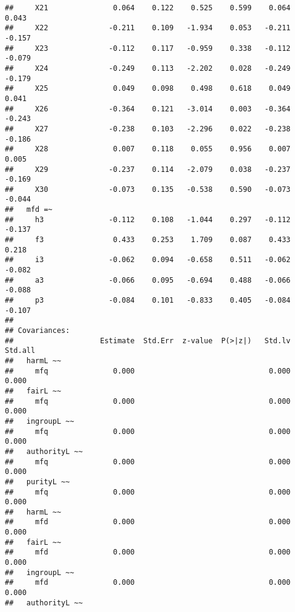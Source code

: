 \documentclass[english,man]{apa6}
\newcounter{author}
\theoremstyle{definition}
\theoremstyle{definition}
\theoremstyle{definition}
\theoremstyle{remark}
\begin{document}
\begin{verbatim}
##     X21               0.064    0.122    0.525    0.599    0.064    0.043
##     X22              -0.211    0.109   -1.934    0.053   -0.211   -0.157
##     X23              -0.112    0.117   -0.959    0.338   -0.112   -0.079
##     X24              -0.249    0.113   -2.202    0.028   -0.249   -0.179
##     X25               0.049    0.098    0.498    0.618    0.049    0.041
##     X26              -0.364    0.121   -3.014    0.003   -0.364   -0.243
##     X27              -0.238    0.103   -2.296    0.022   -0.238   -0.186
##     X28               0.007    0.118    0.055    0.956    0.007    0.005
##     X29              -0.237    0.114   -2.079    0.038   -0.237   -0.169
##     X30              -0.073    0.135   -0.538    0.590   -0.073   -0.044
##   mfd =~                                                                
##     h3               -0.112    0.108   -1.044    0.297   -0.112   -0.137
##     f3                0.433    0.253    1.709    0.087    0.433    0.218
##     i3               -0.062    0.094   -0.658    0.511   -0.062   -0.082
##     a3               -0.066    0.095   -0.694    0.488   -0.066   -0.088
##     p3               -0.084    0.101   -0.833    0.405   -0.084   -0.107
## 
## Covariances:
##                    Estimate  Std.Err  z-value  P(>|z|)   Std.lv  Std.all
##   harmL ~~                                                              
##     mfq               0.000                               0.000    0.000
##   fairL ~~                                                              
##     mfq               0.000                               0.000    0.000
##   ingroupL ~~                                                           
##     mfq               0.000                               0.000    0.000
##   authorityL ~~                                                         
##     mfq               0.000                               0.000    0.000
##   purityL ~~                                                            
##     mfq               0.000                               0.000    0.000
##   harmL ~~                                                              
##     mfd               0.000                               0.000    0.000
##   fairL ~~                                                              
##     mfd               0.000                               0.000    0.000
##   ingroupL ~~                                                           
##     mfd               0.000                               0.000    0.000
##   authorityL ~~                                                         

\end{verbatim}
\end{document}
